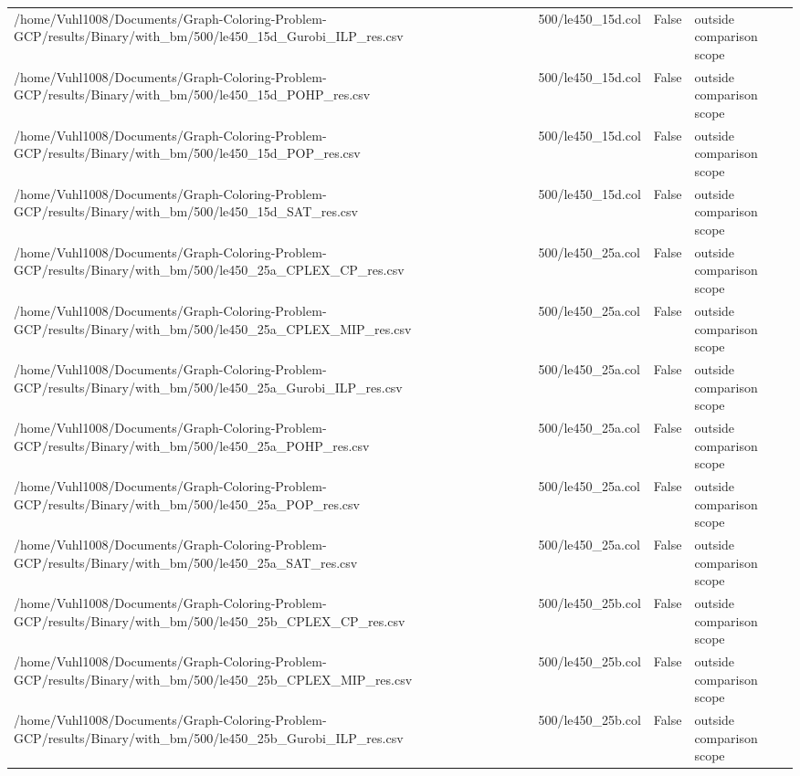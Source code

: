 \begin{table}[htbp]
\begin{tabular}{llll}
/home/Vuhl1008/Documents/Graph-Coloring-Problem-GCP/results/Binary/with\_bm/500/le450\_15d\_Gurobi\_ILP\_res.csv & 500/le450\_15d.col & False & outside comparison scope \\
/home/Vuhl1008/Documents/Graph-Coloring-Problem-GCP/results/Binary/with\_bm/500/le450\_15d\_POHP\_res.csv & 500/le450\_15d.col & False & outside comparison scope \\
/home/Vuhl1008/Documents/Graph-Coloring-Problem-GCP/results/Binary/with\_bm/500/le450\_15d\_POP\_res.csv & 500/le450\_15d.col & False & outside comparison scope \\
/home/Vuhl1008/Documents/Graph-Coloring-Problem-GCP/results/Binary/with\_bm/500/le450\_15d\_SAT\_res.csv & 500/le450\_15d.col & False & outside comparison scope \\
/home/Vuhl1008/Documents/Graph-Coloring-Problem-GCP/results/Binary/with\_bm/500/le450\_25a\_CPLEX\_CP\_res.csv & 500/le450\_25a.col & False & outside comparison scope \\
/home/Vuhl1008/Documents/Graph-Coloring-Problem-GCP/results/Binary/with\_bm/500/le450\_25a\_CPLEX\_MIP\_res.csv & 500/le450\_25a.col & False & outside comparison scope \\
/home/Vuhl1008/Documents/Graph-Coloring-Problem-GCP/results/Binary/with\_bm/500/le450\_25a\_Gurobi\_ILP\_res.csv & 500/le450\_25a.col & False & outside comparison scope \\
/home/Vuhl1008/Documents/Graph-Coloring-Problem-GCP/results/Binary/with\_bm/500/le450\_25a\_POHP\_res.csv & 500/le450\_25a.col & False & outside comparison scope \\
/home/Vuhl1008/Documents/Graph-Coloring-Problem-GCP/results/Binary/with\_bm/500/le450\_25a\_POP\_res.csv & 500/le450\_25a.col & False & outside comparison scope \\
/home/Vuhl1008/Documents/Graph-Coloring-Problem-GCP/results/Binary/with\_bm/500/le450\_25a\_SAT\_res.csv & 500/le450\_25a.col & False & outside comparison scope \\
/home/Vuhl1008/Documents/Graph-Coloring-Problem-GCP/results/Binary/with\_bm/500/le450\_25b\_CPLEX\_CP\_res.csv & 500/le450\_25b.col & False & outside comparison scope \\
/home/Vuhl1008/Documents/Graph-Coloring-Problem-GCP/results/Binary/with\_bm/500/le450\_25b\_CPLEX\_MIP\_res.csv & 500/le450\_25b.col & False & outside comparison scope \\
/home/Vuhl1008/Documents/Graph-Coloring-Problem-GCP/results/Binary/with\_bm/500/le450\_25b\_Gurobi\_ILP\_res.csv & 500/le450\_25b.col & False & outside comparison scope \\

\end{tabular}
\end{table}
